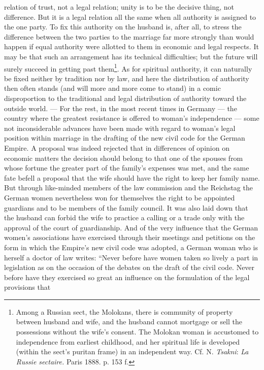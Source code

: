 \documentclass[12pt,a4paper,openany]{book}
\newcommand{\opage}[1]{\marginnote{\footnotesize\textit{[#1]}}}
\begin{document}
relation of trust, not a legal relation; unity is to be the decisive thing, not difference. But it is a legal relation
all the same when all authority is assigned to the one party. To fix this authority on the husband is, after all, to
stress the difference between the two parties to the marriage far more strongly than would happen if equal authority
were allotted to them in economic and legal respects. It may be that such an arrangement has its technical
difficulties; but the future will surely succeed in getting past them\footnote[1]{Among a Russian sect, the Molokans,
there is community of property between husband and wife, and the husband cannot mortgage or sell the possessions without
the wife's consent. The Molokan woman is accustomed to independence from earliest childhood, and her spiritual life is
developed (within the sect's puritan frame) in an independent way. Cf. N. \emph{Tsakni}: \textit{La Russie sectaire.}
Paris 1888. p. 153 f.}. As for spiritual authority, it can naturally be fixed neither by tradition nor by law, and here
the distribution of authority then often stands (and will more and more come to
\opage{307}stand) in a comic disproportion to the traditional and legal distribution of authority toward the outside
world. --- For the rest, in the most recent times in Germany --- the country where the greatest resistance is offered to
woman's independence --- some not inconsiderable advances have been made with regard to woman's legal position within
marriage in the drafting of the new civil code for the German Empire. A proposal was indeed rejected that in differences
of opinion on economic matters the decision should belong to that one of the spouses from whose fortune the greater
part of the family's expenses was met, and the same fate befell a proposal that the wife should have the right to keep
her family name. But through like-minded members of the law commission and the Reichstag the German women nevertheless
won for themselves the right to be appointed guardians and to be members of the family council. It was also laid down
that the husband can forbid the wife to practice a calling or a trade only with the approval of the court of
guardianship. And of the very influence that the German women's associations have exercised through their meetings and
petitions on the form in which the Empire's new civil code was adopted, a German woman who is herself a doctor of law
writes: ``Never before have women taken so lively a part in legislation as on the occasion of the debates on the draft
of the civil code. Never before have they exercised so great an influence on the formulation of the legal provisions that
\end{document}
